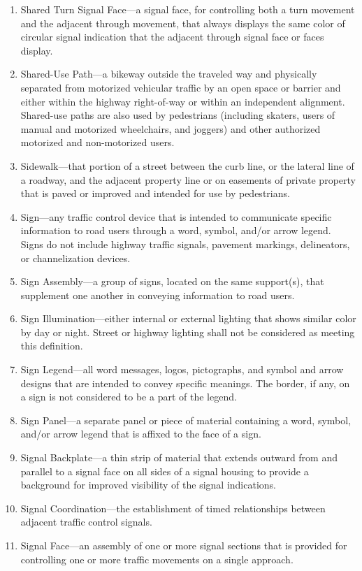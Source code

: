 \documentclass[9pt]{memoir}
\begin{document}
{\begin{enumerate}[label=\arabic*., ref=\arabic*]
\item Shared Turn Signal Face---a signal face, for controlling both a turn movement and the adjacent through movement, that always displays the same color of circular signal indication that the adjacent through signal face or faces display.
\item Shared-Use Path---a bikeway outside the traveled way and physically separated from motorized vehicular traffic by an open space or barrier and either within the highway right-of-way or within an independent alignment. Shared-use paths are also used by pedestrians (including skaters, users of manual and motorized wheelchairs, and joggers) and other authorized motorized and non-motorized users.
\item Sidewalk---that portion of a street between the curb line, or the lateral line of a roadway, and the adjacent property line or on easements of private property that is paved or improved and intended for use by pedestrians.
\item Sign---any traffic control device that is intended to communicate specific information to road users through a word, symbol, and/or arrow legend. Signs do not include highway traffic signals, pavement markings, delineators, or channelization devices.
\item Sign Assembly---a group of signs, located on the same support(s), that supplement one another in conveying information to road users.
\item Sign Illumination---either internal or external lighting that shows similar color by day or night. Street or highway lighting shall not be considered as meeting this definition.
\item Sign Legend---all word messages, logos, pictographs, and symbol and arrow designs that are intended to convey specific meanings. The border, if any, on a sign is not considered to be a part of the legend.
\item Sign Panel---a separate panel or piece of material containing a word, symbol, and/or arrow legend that is affixed to the face of a sign.
\item Signal Backplate---a thin strip of material that extends outward from and parallel to a signal face on all sides of a signal housing to provide a background for improved visibility of the signal indications.
\item Signal Coordination---the establishment of timed relationships between adjacent traffic control signals.
\item Signal Face---an assembly of one or more signal sections that is provided for controlling one or more traffic movements on a single approach.

\end{enumerate}}
\end{document}
